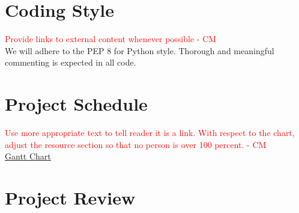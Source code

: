 \documentclass{article}
\begin{document}
\section{Coding Style} %

\textcolor{red}{Provide links to external content whenever possible  - CM} \\
We will adhere to the PEP 8 for Python style. Thorough and meaningful commenting is expected in all code.

\section{Project Schedule}


\textcolor{red}{Use more appropriate text to tell reader it is a link. With respect to the chart, adjust the resource section so that no person is over 100 percent. - CM} \\
 \href{run:../DevelopmentPlan/GanttChart.gan} {Gantt Chart}

\section{Project Review} 
\end{document}
